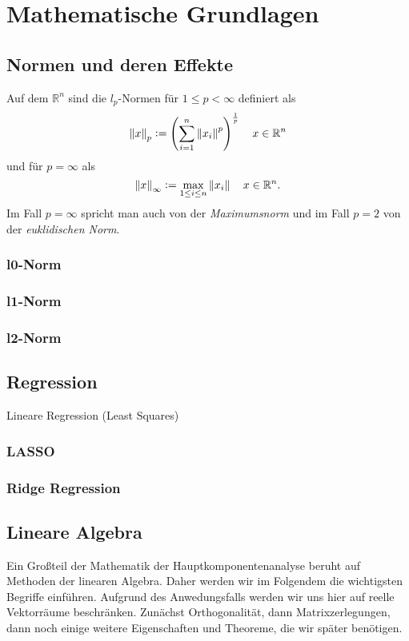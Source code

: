 \chapter{Mathematische Grundlagen}

\label{fundamentals}

\section{Normen und deren Effekte}
\label{norm}

\begin{defn} 
Auf dem $\mathbb{R}^n$ sind die $l_p$-Normen für $1 \leq p < \infty$ definiert als
$$\left\lVert x \right\rVert_p \vcentcolon= \left( \sum_{i=1}^{n} \left\lVert x_i \right\rVert^{p} \right) ^{\frac{1}{p}} \quad x \in \mathbb{R}^{n}$$
und für $p = \infty$ als
$$\left\lVert x \right\rVert_{\infty} \vcentcolon= \max_{1 \leq i \leq n} \left\lVert x_i \right\rVert \quad x \in \mathbb{R}^{n}.$$
Im Fall $p = \infty$ spricht man auch von der \textit{Maximumsnorm} und im Fall $p = 2$ von der \textit{euklidischen Norm}.
\end{defn}
\subsection{l0-Norm}
\subsection{l1-Norm}
\subsection{l2-Norm}

\section{Regression}
Lineare Regression (Least Squares)
\subsection{LASSO}
\subsection{Ridge Regression}

\section{Lineare Algebra}

Ein Großteil der Mathematik der Hauptkomponentenanalyse beruht auf Methoden der linearen Algebra. Daher werden wir im Folgendem die wichtigsten Begriffe einführen. Aufgrund des Anwedungsfalls werden wir uns hier auf reelle Vektorräume beschränken.
Zunächst Orthogonalität, dann Matrixzerlegungen, dann noch einige weitere Eigenschaften und Theoreme, die wir später benötigen.

